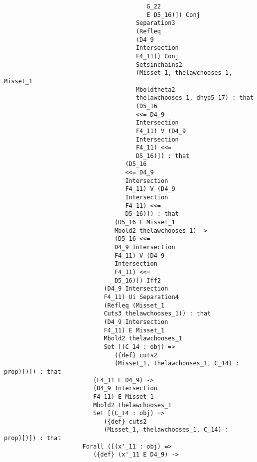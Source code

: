 \documentclass[12pt]{article}
\begin{document}
\begin{verbatim}
                                        G_22 
                                        E D5_16)]) Conj 
                                     Separation3 
                                     (Refleq 
                                     (D4_9 
                                     Intersection 
                                     F4_11)) Conj 
                                     Setsinchains2 
                                     (Misset_1, thelawchooses_1, Misset_1 
                                     Mboldtheta2 
                                     thelawchooses_1, dhyp5_17) : that 
                                     (D5_16 
                                     <<= D4_9 
                                     Intersection 
                                     F4_11) V (D4_9 
                                     Intersection 
                                     F4_11) <<= 
                                     D5_16)]) : that 
                                  (D5_16 
                                  <<= D4_9 
                                  Intersection 
                                  F4_11) V (D4_9 
                                  Intersection 
                                  F4_11) <<= 
                                  D5_16)]) : that 
                               (D5_16 E Misset_1 
                               Mbold2 thelawchooses_1) -> 
                               (D5_16 <<= 
                               D4_9 Intersection 
                               F4_11) V (D4_9 
                               Intersection 
                               F4_11) <<= 
                               D5_16)]) Iff2 
                            (D4_9 Intersection 
                            F4_11) Ui Separation4 
                            (Refleq (Misset_1 
                            Cuts3 thelawchooses_1)) : that 
                            (D4_9 Intersection 
                            F4_11) E Misset_1 
                            Mbold2 thelawchooses_1 
                            Set [(C_14 : obj) => 
                               ({def} cuts2 
                               (Misset_1, thelawchooses_1, C_14) : prop)])]) : that 
                         (F4_11 E D4_9) -> 
                         (D4_9 Intersection 
                         F4_11) E Misset_1 
                         Mbold2 thelawchooses_1 
                         Set [(C_14 : obj) => 
                            ({def} cuts2 
                            (Misset_1, thelawchooses_1, C_14) : prop)])]) : that 
                      Forall ([(x'_11 : obj) => 
                         ({def} (x'_11 E D4_9) -> 

\end{verbatim}
\end{document}
